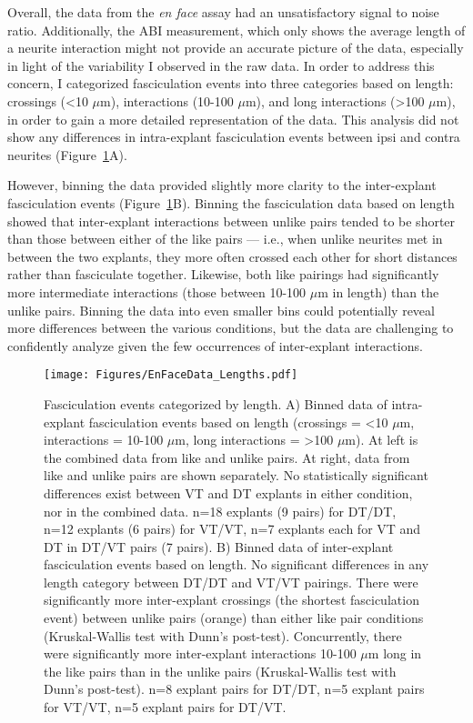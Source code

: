 Overall, the data from the \emph{en face} assay had an unsatisfactory signal to noise ratio.
Additionally, the ABI measurement, which only shows the average length of a neurite interaction might not provide an accurate picture of the data, especially in light of the variability I observed in the raw data.
In order to address this concern, I categorized fasciculation events into three categories based on length: crossings (<10 $\mu$m), interactions (10-100 $\mu$m), and long interactions (>100 $\mu$m), in order to gain a more detailed representation of the data.
This analysis did not show any differences in intra-explant fasciculation events between ipsi and contra neurites (Figure~\ref{Figures/EnFaceDataLengths}A).

However, binning the data provided slightly more clarity to the inter-explant fasciculation events (Figure~\ref{Figures/EnFaceDataLengths}B).
Binning the fasciculation data based on length showed that inter-explant interactions between unlike pairs tended to be shorter than those between either of the like pairs --- i.e., when unlike neurites met in between the two explants, they more often crossed each other for short distances rather than fasciculate together.
Likewise, both like pairings had significantly more intermediate interactions (those between 10-100 $\mu$m in length) than the unlike pairs.
Binning the data into even smaller bins could potentially reveal more differences between the various conditions, but the data are challenging to confidently analyze given the few occurrences of inter-explant interactions.
\begin{figure}[hbtp]
    \begin{center}
        \texttt{[image: Figures/EnFaceData\_Lengths.pdf]}
        \caption[Fasciculation events categorized by length.]
        {Fasciculation events categorized by length.
        A) Binned data of intra-explant fasciculation events based on length (crossings = <10 $\mu$m, interactions = 10-100 $\mu$m, long interactions = >100 $\mu$m).
        At left is the combined data from like and unlike pairs.
        At right, data from like and unlike pairs are shown separately.
        No statistically significant differences exist between VT and DT explants in either condition, nor in the combined data.
        n=18 explants (9 pairs) for DT/DT, n=12 explants (6 pairs) for VT/VT, n=7 explants each for VT and DT in DT/VT pairs (7 pairs).
        B) Binned data of inter-explant fasciculation events based on length.
        No significant differences in any length category between DT/DT and VT/VT pairings.
        There were significantly more inter-explant crossings (the shortest fasciculation event) between unlike pairs (orange) than either like pair conditions (Kruskal-Wallis test with Dunn's post-test).
        Concurrently, there were significantly more inter-explant interactions 10-100 $\mu$m long in the like pairs than in the unlike pairs (Kruskal-Wallis test with Dunn's post-test).
        n=8 explant pairs for DT/DT, n=5 explant pairs for VT/VT, n=5 explant pairs for DT/VT.
        }
        \label{Figures/EnFaceDataLengths}
    \end{center}
\end{figure}

